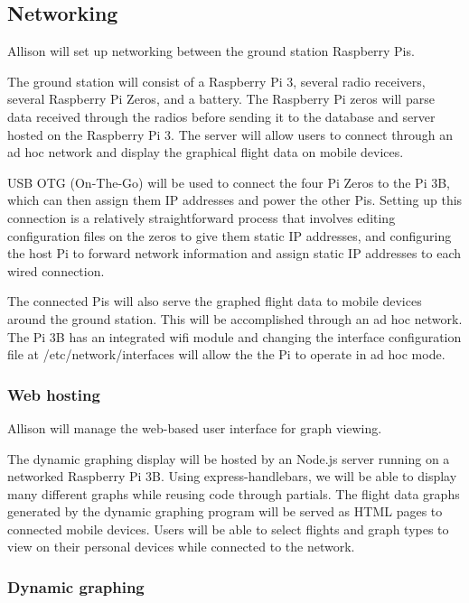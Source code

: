 \documentclass[onecolumn, draftclsnofoot, 10pt, compsoc]{IEEEtran}
\begin{document}
\subsection{Networking}
Allison will set up networking between the ground station Raspberry Pis.

The ground station will consist of a Raspberry Pi 3, several radio receivers, several Raspberry Pi Zeros, and a battery. 
The Raspberry Pi zeros will parse data received through the radios before sending it to the database and server hosted on the Raspberry  Pi 3. 
The server will allow users to connect through an ad hoc network and display the graphical flight data on mobile devices. 

USB OTG (On-The-Go) will be used to connect the four Pi Zeros to the Pi 3B, which can then assign them IP addresses and power the other Pis. 
Setting up this connection is a relatively straightforward process that involves editing configuration files on the zeros to give them static IP addresses, and configuring the host Pi to forward network information and assign static IP addresses to each wired connection. \cite{OTG}

The connected Pis will also serve the graphed flight data to mobile devices around the ground station.
This will be accomplished through an ad hoc network. 
The Pi 3B has an integrated wifi module and changing the interface configuration file at /etc/network/interfaces will allow the the Pi to operate in ad hoc mode. \cite{config-adhoc}

\subsubsection{Web hosting}

Allison will manage the web-based user interface for graph viewing.

The dynamic graphing display will be hosted by an Node.js server running on a networked Raspberry Pi 3B. 
Using express-handlebars, we will be able to display many different graphs while reusing code through partials. 
The flight data graphs generated by the dynamic graphing program will be served as HTML pages to connected mobile devices.
Users will be able to select flights and graph types to view on their personal devices while connected to the network.


\subsubsection{Dynamic graphing}
\end{document}

